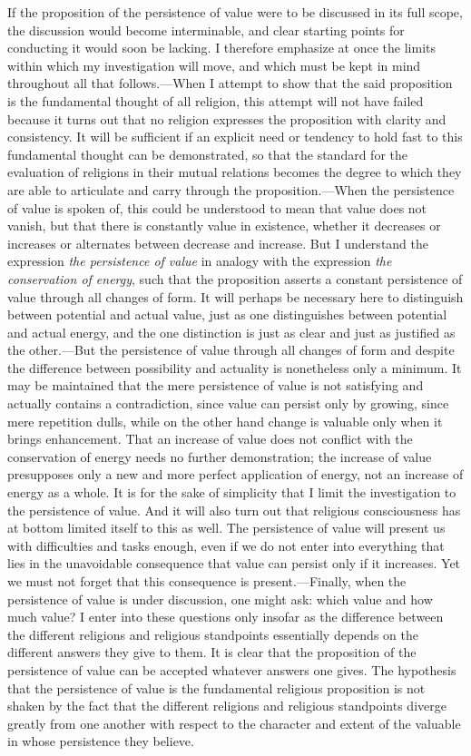 \documentclass[12pt,a4paper]{book}
\newcommand{\opage}[1]{\marginnote{\footnotesize\textit{[#1]}}}
\begin{document}
If the proposition of the persistence of value were to be discussed in
its full scope, the discussion would become interminable, and clear
starting points for conducting it would soon be lacking. I therefore
emphasize at once the limits within which my investigation will move,
and which must be kept in mind throughout all that follows.---When I
attempt to show that the said proposition is the fundamental thought of
all religion, this attempt will not have failed because it turns out
that no religion expresses the proposition with clarity and consistency.
It will be sufficient if an explicit need or tendency to hold fast to
this fundamental thought can be demonstrated, so that the standard for
the evaluation of religions in their mutual relations becomes the degree
to which they are able to articulate and carry through the
proposition.---When the persistence of value is spoken of, this could be
understood to mean that value does not vanish, but that there is
constantly value in existence, whether it decreases or increases or
alternates 
\opage{10}between decrease and increase. But I understand the
expression \emph{the persistence of value} in analogy with the
expression \emph{the conservation of energy}, such that the proposition
asserts a constant persistence of value through all changes of form. It
will perhaps be necessary here to distinguish between potential and
actual value, just as one distinguishes between potential and actual
energy, and the one distinction is just as clear and just as justified
as the other.---But the persistence of value through all changes of form
and despite the difference between possibility and actuality is
nonetheless only a minimum. It may be maintained that the mere
persistence of value is not satisfying and actually contains a
contradiction, since value can persist only by growing, since mere
repetition dulls, while on the other hand change is valuable only when
it brings enhancement. That an increase of value does not conflict with
the conservation of energy needs no further demonstration; the increase
of value presupposes only a new and more perfect application of energy,
not an increase of energy as a whole. It is for the sake of simplicity
that I limit the investigation to the persistence of value. And it will
also turn out that religious consciousness has at bottom limited itself
to this as well. The persistence of value will present us with
difficulties and tasks enough, even if we do not enter into everything
that lies in the unavoidable consequence that value can persist only if
it increases. Yet we must not forget that this consequence is
present.---Finally, when the persistence of value is under discussion,
one might ask: which value and how much value? I enter into these
questions only insofar as the difference between the different religions
and religious standpoints essentially depends on the different answers
they give to them. It is clear that the proposition of the persistence
of value can be accepted whatever answers one gives. The hypothesis that
the persistence of value is the fundamental religious proposition is not
shaken by the fact that the different religions and religious
standpoints diverge greatly from one another with respect to the
character and extent of the valuable in whose persistence they believe.
\end{document}
